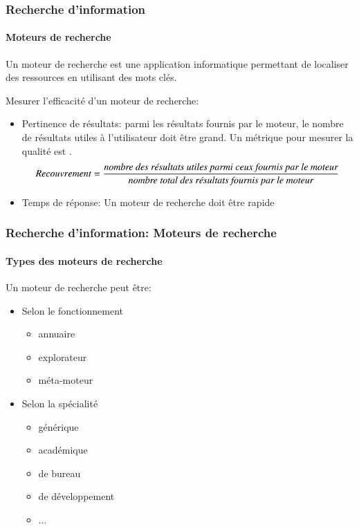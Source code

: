 \documentclass[xcolor=table]{beamer}
\begin{document}
\begin{frame}
\frametitle{Recherche d'information}
\framesubtitle{Moteurs de recherche}

\begin{definition}
	Un moteur de recherche est une application informatique permettant de localiser des ressources en utilisant des mots clés.
\end{definition}

Mesurer l'efficacité d'un moteur de recherche:
\begin{itemize}
	\item Pertinence de résultats: parmi les résultats fournis par le moteur, le nombre de résultats utiles à l'utilisateur doit être grand. Un métrique pour mesurer la qualité est .
	{\scriptsize \[ Recouvrement = \frac{\text{\itshape nombre des résultats utiles parmi ceux fournis par le moteur}}{\text{\itshape nombre total des résultats fournis par le moteur}} \]}
	\item Temps de réponse: Un moteur de recherche doit être rapide
\end{itemize}

\end{frame}

\begin{frame}
\frametitle{Recherche d'information: Moteurs de recherche}
\framesubtitle{Types des moteurs de recherche}

Un moteur de recherche peut être:
\begin{itemize}
	\item Selon le fonctionnement
	\begin{itemize}
		\item annuaire
		\item explorateur
		\item méta-moteur
	\end{itemize}

	\item Selon la spécialité
	\begin{itemize}
		\item générique
		\item académique
		\item de bureau 
		\item de développement
		\item ...
	\end{itemize}
\end{itemize} 

\end{frame}
\end{document}
